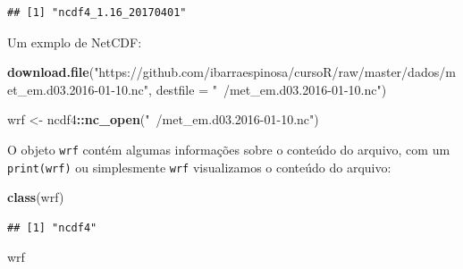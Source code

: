 \documentclass[]{book}
\newenvironment{Shaded}{\begin{snugshade}}{\end{snugshade}}
\newcommand{\KeywordTok}[1]{\textcolor[rgb]{0.13,0.29,0.53}{\textbf{#1}}}
\newcommand{\DataTypeTok}[1]{\textcolor[rgb]{0.13,0.29,0.53}{#1}}
\newcommand{\StringTok}[1]{\textcolor[rgb]{0.31,0.60,0.02}{#1}}
\newcommand{\OperatorTok}[1]{\textcolor[rgb]{0.81,0.36,0.00}{\textbf{#1}}}
\newcommand{\NormalTok}[1]{#1}
\begin{document}
\begin{verbatim}
## [1] "ncdf4_1.16_20170401"
\end{verbatim}

Um exmplo de NetCDF:

\begin{Shaded}
\begin{Highlighting}[]
\KeywordTok{download.file}\NormalTok{(}\StringTok{"https://github.com/ibarraespinosa/cursoR/raw/master/dados/met_em.d03.2016-01-10.nc"}\NormalTok{, }\DataTypeTok{destfile =} \StringTok{"~/met_em.d03.2016-01-10.nc"}\NormalTok{)}
\end{Highlighting}
\end{Shaded}

\begin{Shaded}
\begin{Highlighting}[]
\NormalTok{wrf <-}\StringTok{ }\NormalTok{ncdf4}\OperatorTok{::}\KeywordTok{nc_open}\NormalTok{(}\StringTok{"~/met_em.d03.2016-01-10.nc"}\NormalTok{)}
\end{Highlighting}
\end{Shaded}

O objeto \texttt{wrf} contém algumas informações sobre o conteúdo do
arquivo, com um \texttt{print(wrf)} ou simplesmente \texttt{wrf}
visualizamos o conteúdo do arquivo:

\begin{Shaded}
\begin{Highlighting}[]
\KeywordTok{class}\NormalTok{(wrf)}
\end{Highlighting}
\end{Shaded}

\begin{verbatim}
## [1] "ncdf4"
\end{verbatim}

\begin{Shaded}
\begin{Highlighting}[]
\NormalTok{wrf}
\end{Highlighting}
\end{Shaded}
\end{document}
